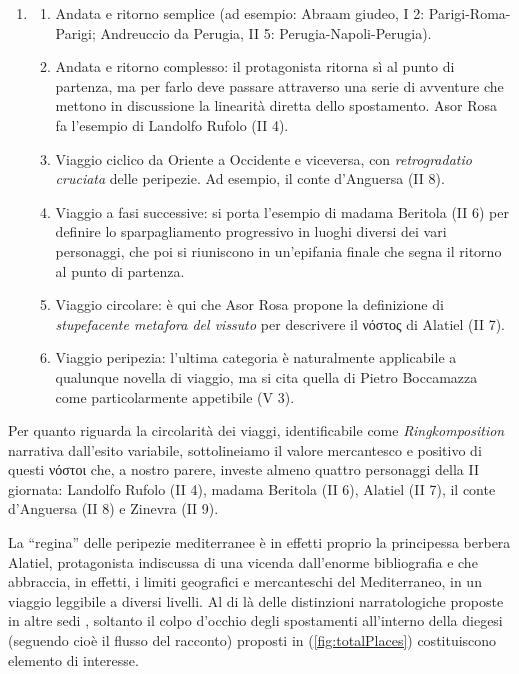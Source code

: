 \begin{enumerate}
\def\labelenumi{(\arabic{enumi})}
\item
  \begin{enumerate}
  \def\labelenumii{(\roman{enumii})}
  \tightlist
  \item
    Andata e ritorno semplice (ad esempio: Abraam giudeo, I 2:
    Parigi-Roma-Parigi; Andreuccio da Perugia, II 5:
    Perugia-Napoli-Perugia).
  \item
    Andata e ritorno complesso: il protagonista ritorna sì al punto di
    partenza, ma per farlo deve passare attraverso una serie di
    avventure che mettono in discussione la linearità diretta dello
    spostamento. Asor Rosa fa l'esempio di Landolfo Rufolo (II 4).
  \item
    Viaggio ciclico da Oriente a Occidente e viceversa, con
    \emph{retrogradatio cruciata} delle peripezie. Ad esempio, il conte
    d'Anguersa (II 8).
  \item
    Viaggio a fasi successive: si porta l'esempio di madama Beritola (II
    6) per definire lo sparpagliamento progressivo in luoghi diversi dei
    vari personaggi, che poi si riuniscono in un'epifania finale che
    segna il ritorno al punto di partenza.
  \item
    Viaggio circolare: è qui che Asor Rosa propone la definizione di
    \emph{stupefacente metafora del vissuto} per descrivere il νόστος di
    Alatiel (II 7).
  \item
    Viaggio peripezia: l'ultima categoria è naturalmente applicabile a
    qualunque novella di viaggio, ma si cita quella di Pietro Boccamazza
    come particolarmente appetibile (V 3).
  \end{enumerate}
\end{enumerate}

Per quanto riguarda la circolarità dei viaggi, identificabile come
\emph{Ringkomposition} narrativa dall'esito variabile, sottolineiamo il
valore mercantesco e positivo di questi νόστοι che, a nostro parere,
investe almeno quattro personaggi della II giornata: Landolfo Rufolo (II
4), madama Beritola (II 6), Alatiel (II 7), il conte d'Anguersa (II 8) e
Zinevra (II 9).

La ``regina'' delle peripezie mediterranee è in effetti proprio la
principessa berbera Alatiel, protagonista indiscussa di una vicenda
dall'enorme bibliografia e che abbraccia, in effetti, i limiti
geografici e mercanteschi del Mediterraneo, in un viaggio leggibile a
diversi livelli. Al di là delle distinzioni narratologiche proposte in
altre sedi \autocite{bolpagni2016}, soltanto il colpo d'occhio degli
spostamenti all'interno della diegesi (seguendo cioè il flusso del
racconto) proposti in (\ref{fig:totalPlaces}) costituiscono elemento di
interesse.

